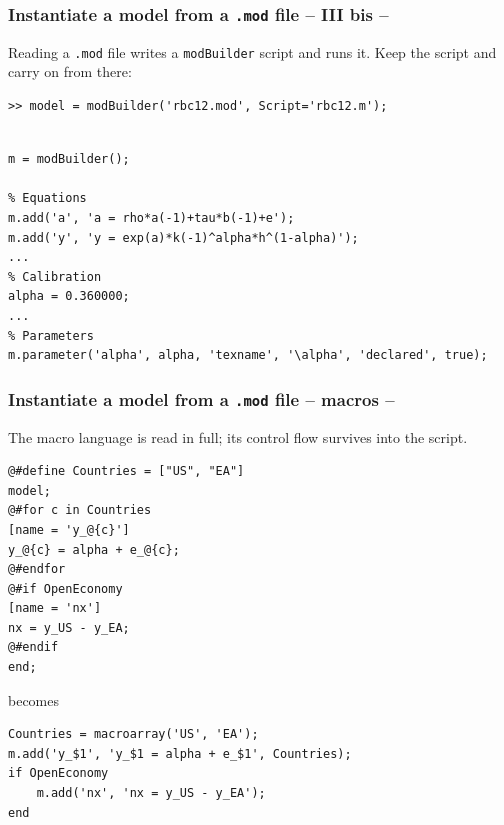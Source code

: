 \documentclass[10pt,slidestop]{beamer}
\theoremstyle{plain}
\begin{document}
\begin{frame}[fragile]
  \frametitle{Instantiate a model from a \texttt{.mod} file -- III bis --}

  Reading a \texttt{.mod} file writes a \texttt{modBuilder} script and runs it. Keep
  the script and carry on from there:

  \begin{lstlisting}[style=MatlabConsole,basicstyle=\ttfamily\footnotesize]
    >> model = modBuilder('rbc12.mod', Script='rbc12.m');
   \end{lstlisting}

  \begin{lstlisting}[style=MatlabConsole,basicstyle=\ttfamily\footnotesize]
% modBuilder script generated from rbc12.mod. Edit freely.

m = modBuilder();

% Equations
m.add('a', 'a = rho*a(-1)+tau*b(-1)+e');
m.add('y', 'y = exp(a)*k(-1)^alpha*h^(1-alpha)');
...
% Calibration
alpha = 0.360000;
...
% Parameters
m.parameter('alpha', alpha, 'texname', '\alpha', 'declared', true);
  \end{lstlisting}

\end{frame}


\begin{frame}[fragile]
  \frametitle{Instantiate a model from a \texttt{.mod} file -- macros --}

  The macro language is read in full; its control flow survives into the script.

  \begin{lstlisting}[language=Dynare,basicstyle=\scriptsize\ttfamily]
@#define Countries = ["US", "EA"]
model;
@#for c in Countries
[name = 'y_@{c}']
y_@{c} = alpha + e_@{c};
@#endfor
@#if OpenEconomy
[name = 'nx']
nx = y_US - y_EA;
@#endif
end;
  \end{lstlisting}

  becomes

  \begin{lstlisting}[style=MatlabConsole,basicstyle=\ttfamily\footnotesize]
Countries = macroarray('US', 'EA');
m.add('y_$1', 'y_$1 = alpha + e_$1', Countries);
if OpenEconomy
    m.add('nx', 'nx = y_US - y_EA');
end
  \end{lstlisting}

\end{frame}
\end{document}
